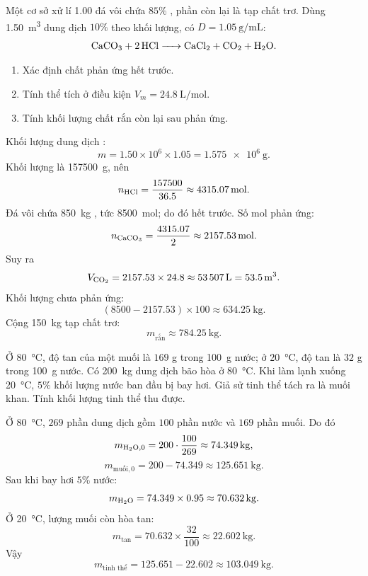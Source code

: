 \begin{tuluyen}
Một cơ sở xử lí \SI{1.00}{\ton} đá vôi chứa \(85\%\) , phần còn lại là tạp chất trơ. Dùng \SI{1.50}{\cubic\metre} dung dịch  \(10\%\) theo khối lượng, có \(D=\SI{1.05}{\gram\per\milli\liter}\):
\[
\ce{CaCO3 + 2HCl -> CaCl2 + CO2 + H2O}.
\]
\begin{enumerate}
\item Xác định chất phản ứng hết trước.
\item Tính thể tích  ở điều kiện \(V_m=\SI{24.8}{\liter\per\mole}\).
\item Tính khối lượng chất rắn còn lại sau phản ứng.
\end{enumerate}
\begin{loigiaiBT}
Khối lượng dung dịch :
\[
m=1.50\times10^6\times1.05=\SI{1.575e6}{\gram}.
\]
Khối lượng  là \SI{157500}{\gram}, nên
\[
n_{\ce{HCl}}=\frac{157500}{36.5}\approx\SI{4315.07}{\mole}.
\]
Đá vôi chứa \SI{850}{\kilo\gram} , tức \SI{8500}{\mole}; do đó  hết trước.
Số mol  phản ứng:
\[
n_{\ce{CaCO3}}=\frac{4315.07}{2}\approx\SI{2157.53}{\mole}.
\]
Suy ra
\[
V_{\ce{CO2}}=2157.53\times24.8\approx\SI{53507}{\liter}
=\SI{53.5}{\cubic\metre}.
\]
Khối lượng  chưa phản ứng:
\[
(8500-2157.53)\times100\approx\SI{634.25}{\kilo\gram}.
\]
Cộng \SI{150}{\kilo\gram} tạp chất trơ:
\[
m_{\text{rắn}}\approx\SI{784.25}{\kilo\gram}.
\]
\end{loigiaiBT}
\end{tuluyen}

\begin{tuluyen}
Ở \SI{80}{\degreeCelsius}, độ tan của một muối là \(169\) g trong \SI{100}{\gram} nước; ở \SI{20}{\degreeCelsius}, độ tan là \(32\) g trong \SI{100}{\gram} nước. Có \SI{200}{\kilo\gram} dung dịch bão hòa ở \SI{80}{\degreeCelsius}. Khi làm lạnh xuống \SI{20}{\degreeCelsius}, \(5\%\) khối lượng nước ban đầu bị bay hơi. Giả sử tinh thể tách ra là muối khan. Tính khối lượng tinh thể thu được.
\begin{loigiaiBT}
Ở \SI{80}{\degreeCelsius}, \(269\) phần dung dịch gồm \(100\) phần nước và \(169\) phần muối. Do đó
\[
m_{\ce{H2O},0}=200\cdot\frac{100}{269}\approx\SI{74.349}{\kilo\gram},
\]
\[
m_{\text{muối},0}=200-74.349\approx\SI{125.651}{\kilo\gram}.
\]
Sau khi bay hơi \(5\%\) nước:
\[
m_{\ce{H2O}}=74.349\times0.95\approx\SI{70.632}{\kilo\gram}.
\]
Ở \SI{20}{\degreeCelsius}, lượng muối còn hòa tan:
\[
m_{\text{tan}}=70.632\times\frac{32}{100}\approx\SI{22.602}{\kilo\gram}.
\]
Vậy
\[
m_{\text{tinh thể}}=125.651-22.602\approx\SI{103.049}{\kilo\gram}.
\]
\end{loigiaiBT}
\end{tuluyen}

